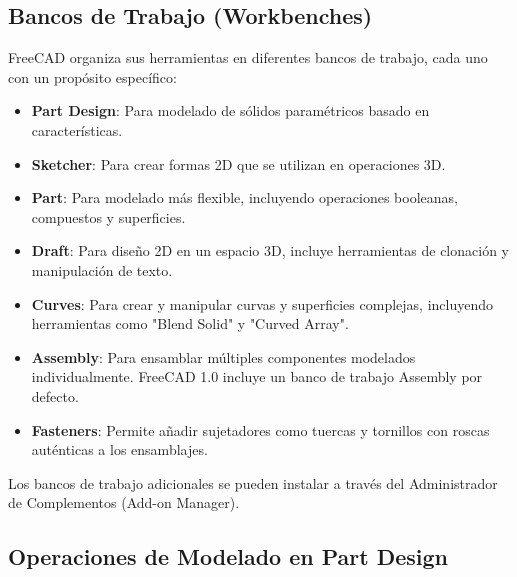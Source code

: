 \documentclass{article}
\begin{document}
\subsection*{Bancos de Trabajo (Workbenches)}
FreeCAD organiza sus herramientas en diferentes bancos de trabajo, cada uno con un propósito específico:
\begin{itemize}[noitemsep,topsep=0pt]
    \item \textbf{Part Design}: Para modelado de sólidos paramétricos basado en características.
    \item \textbf{Sketcher}: Para crear formas 2D que se utilizan en operaciones 3D.
    \item \textbf{Part}: Para modelado más flexible, incluyendo operaciones booleanas, compuestos y superficies.
    \item \textbf{Draft}: Para diseño 2D en un espacio 3D, incluye herramientas de clonación y manipulación de texto.
    \item \textbf{Curves}: Para crear y manipular curvas y superficies complejas, incluyendo herramientas como "Blend Solid" y "Curved Array".
    \item \textbf{Assembly}: Para ensamblar múltiples componentes modelados individualmente. FreeCAD 1.0 incluye un banco de trabajo Assembly por defecto.
    \item \textbf{Fasteners}: Permite añadir sujetadores como tuercas y tornillos con roscas auténticas a los ensamblajes.
\end{itemize}
Los bancos de trabajo adicionales se pueden instalar a través del Administrador de Complementos (Add-on Manager).

\subsection*{Operaciones de Modelado en Part Design}
\end{document}
